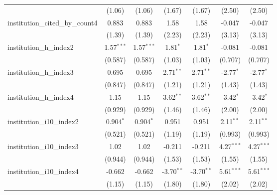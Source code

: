 \begin{tabular}{lcccccc}
                                         & (1.06)        & (1.06)        & (1.67)        & (1.67)        & (2.50)       & (2.50)\\   
   institution\_cited\_by\_count4        & 0.883         & 0.883         & 1.58          & 1.58          & -0.047       & -0.047\\   
                                         & (1.39)        & (1.39)        & (2.23)        & (2.23)        & (3.13)       & (3.13)\\   
   institution\_h\_index2                & 1.57$^{***}$  & 1.57$^{***}$  & 1.81$^{*}$    & 1.81$^{*}$    & -0.081       & -0.081\\   
                                         & (0.587)       & (0.587)       & (1.03)        & (1.03)        & (0.707)      & (0.707)\\   
   institution\_h\_index3                & 0.695         & 0.695         & 2.71$^{**}$   & 2.71$^{**}$   & -2.77$^{*}$  & -2.77$^{*}$\\   
                                         & (0.847)       & (0.847)       & (1.21)        & (1.21)        & (1.43)       & (1.43)\\   
   institution\_h\_index4                & 1.15          & 1.15          & 3.62$^{**}$   & 3.62$^{**}$   & -3.42$^{*}$  & -3.42$^{*}$\\   
                                         & (0.929)       & (0.929)       & (1.46)        & (1.46)        & (2.00)       & (2.00)\\   
   institution\_i10\_index2              & 0.904$^{*}$   & 0.904$^{*}$   & 0.951         & 0.951         & 2.11$^{**}$  & 2.11$^{**}$\\   
                                         & (0.521)       & (0.521)       & (1.19)        & (1.19)        & (0.993)      & (0.993)\\   
   institution\_i10\_index3              & 1.02          & 1.02          & -0.211        & -0.211        & 4.27$^{***}$ & 4.27$^{***}$\\   
                                         & (0.944)       & (0.944)       & (1.53)        & (1.53)        & (1.55)       & (1.55)\\   
   institution\_i10\_index4              & -0.662        & -0.662        & -3.70$^{**}$  & -3.70$^{**}$  & 5.61$^{***}$ & 5.61$^{***}$\\   
                                         & (1.15)        & (1.15)        & (1.80)        & (1.80)        & (2.02)       & (2.02)\\   

\end{tabular}
